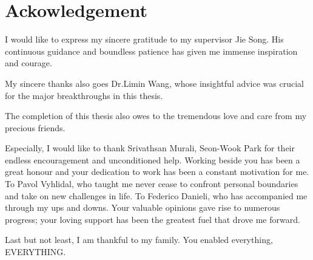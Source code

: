 
\chapter*{Ackowledgement}
I would like to express my sincere gratitude to my supervisor Jie Song. His continuous guidance and boundless patience has given me immense inspiration and courage. 

My sincere thanks also goes Dr.Limin Wang, whose insightful advice was crucial for the major breakthroughs in this thesis.

The completion of this thesis also owes to the tremendous love and care from my precious friends.

Especially, I would like to thank Srivathsan Murali, Seon-Wook Park for their endless encouragement and unconditioned help. 
Working beside you has been a great honour and your dedication to work has been a constant motivation for me.\newline 
To Pavol Vyhlidal, who taught me never cease to confront personal boundaries and take on new challenges in life.\newline
To Federico Danieli, who has accompanied me through my ups and downs.
Your valuable opinions gave rise to numerous progress; your loving support has been the greatest fuel that drove me forward.

Last but not least, I am thankful to my family. You enabled everything, EVERYTHING.